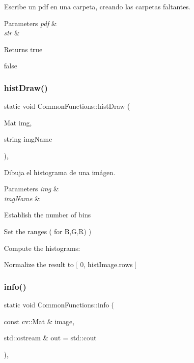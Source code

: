 Escribe un pdf en una carpeta, creando las carpetas faltantes. 


\begin{DoxyParams}{Parameters}
{\em pdf} & \\
\hline
{\em str} & \\
\hline
\end{DoxyParams}
\begin{DoxyReturn}{Returns}
true 

false 
\end{DoxyReturn}
\mbox{\label{classCommonFunctions_a7b0e52ec4c30af5244724936f163c2d1}} 
\subsubsection{\texorpdfstring{hist\+Draw()}{histDraw()}}
{\footnotesize\ttfamily static void Common\+Functions\+::hist\+Draw (\begin{DoxyParamCaption}\item[{Mat}]{img,  }\item[{string}]{img\+Name }\end{DoxyParamCaption})\hspace{0.3cm}{\ttfamily [inline]}, {\ttfamily [static]}}



Dibuja el histograma de una imágen. 


\begin{DoxyParams}{Parameters}
{\em img} & \\
\hline
{\em img\+Name} & \\
\hline
\end{DoxyParams}
Establish the number of bins

Set the ranges ( for B,G,R) )

Compute the histograms\+:

Normalize the result to \mbox{[} 0, hist\+Image.\+rows \mbox{]} \mbox{\label{classCommonFunctions_a51a3e18bdcc2c918ebc81f0cc1f47851}} 
\subsubsection{\texorpdfstring{info()}{info()}}
{\footnotesize\ttfamily static void Common\+Functions\+::info (\begin{DoxyParamCaption}\item[{const cv\+::\+Mat \&}]{image,  }\item[{std\+::ostream \&}]{out = {\ttfamily std\+:\+:cout} }\end{DoxyParamCaption})\hspace{0.3cm}{\ttfamily [inline]}, {\ttfamily [static]}}




